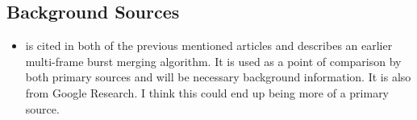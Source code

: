 \documentclass{sig-alternate}
\begin{document}
\subsection{Background Sources}
\begin{itemize}
\item \cite{Hasinoff2016} is cited in both of the previous mentioned articles and describes an earlier multi-frame burst merging algorithm. It is used as a point of comparison by both primary sources and will be necessary background information. It is also from Google Research. I think this could end up being more of a primary source.

\end{itemize}

  

\end{document}

